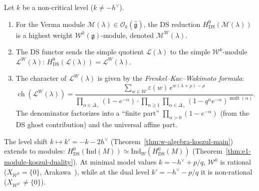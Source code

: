 \begin{proposition}
\label{prop:w-module-structure}
Let $k$ be a non-critical level ($k \neq -h^\vee$).
\begin{enumerate}[label=\textup{(\roman*)}]
\item For the Verma module $\mathcal{M}(\lambda) \in
  \mathcal{O}_k(\widehat{\mathfrak{g}})$, the DS reduction
  $H^0_{\mathrm{DS}}(\mathcal{M}(\lambda))$ is a highest weight
  $\mathcal{W}^k(\mathfrak{g})$-module, denoted
  $\mathcal{M}^W(\lambda)$.
\item The DS functor sends the simple quotient
  $\mathcal{L}(\lambda)$ to the simple
  $\mathcal{W}^k$-module $\mathcal{L}^W(\lambda)$:
  $H^0_{\mathrm{DS}}(\mathcal{L}(\lambda)) = \mathcal{L}^W(\lambda)$.
\item The character of $\mathcal{L}^W(\lambda)$ is given by the
  \emph{Frenkel--Kac--Wakimoto formula}:
  \begin{equation}\label{eq:w-character}
  \operatorname{ch}(\mathcal{L}^W(\lambda))
  = \frac{\sum_{w \in \mathcal{W}} \varepsilon(w)\,
     e^{w(\lambda + \rho) - \rho}}
    {\prod_{\alpha \in \Delta_+}(1 - e^{-\alpha})
     \cdot \prod_{n \geq 1} \prod_{\alpha \in \Delta_+}
     (1 - q^n e^{-\alpha})^{\operatorname{mult}(\alpha)}}.
  \end{equation}
  The denominator factorizes into a ``finite part''
  $\prod_{\alpha > 0}(1 - e^{-\alpha})$ (from the DS ghost
  contribution) and the universal affine part.
\end{enumerate}
\end{proposition}

\begin{remark}
\label{rem:w-module-koszul}
The level shift $k \mapsto k' = -k - 2h^\vee$ (Theorem~\ref{thm:w-algebra-koszul-main}) extends to modules: $H^0_{\mathrm{DS}}(\mathrm{Ind}(M)) \simeq \mathrm{Ind}_W(H^0_{\mathrm{DS}}(M))$ (Theorem~\ref{thm:e1-module-koszul-duality}).  At minimal model values $k = -h^\vee + p/q$, $\mathcal{W}^k$ is rational ($X_{\mathcal{W}^k} = \{0\}$, Arakawa~\cite{Arakawa17}), while at the dual level $k' = -h^\vee - p/q$ it is non-rational ($X_{\mathcal{W}^{k'}} \neq \{0\}$).
\end{remark}

